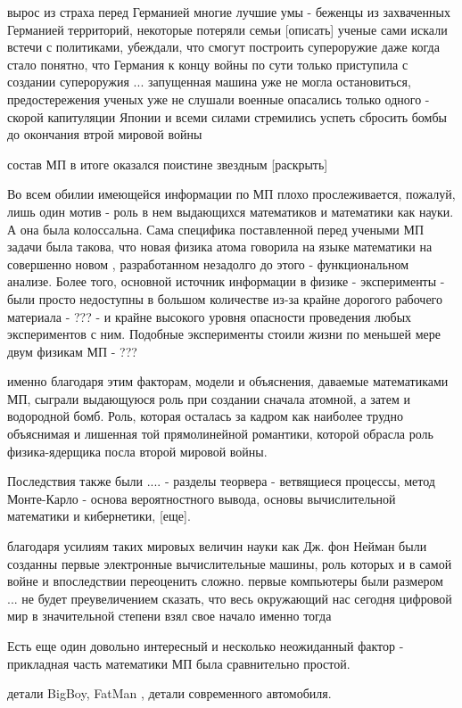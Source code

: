 вырос из страха перед Германией
многие лучшие умы - беженцы из захваченных Германией территорий, некоторые потеряли семьи [описать]
ученые сами искали встечи с политиками, убеждали, что смогут построить супероружие
даже когда стало понятно, что Германия к концу войны по сути только приступила с создании супероружия ...  запущенная машина уже не могла остановиться, предостережения ученых уже не слушали
военные опасались только  одного - скорой капитуляции Японии и всеми силами стремились успеть сбросить бомбы до окончания втрой мировой войны

состав МП в итоге оказался поистине звездным [раскрыть]

Во всем обилии имеющейся информации по МП плохо прослеживается, пожалуй, лишь один мотив - роль в нем выдающихся математиков и математики как науки.
А она была колоссальна.
Сама специфика поставленной перед учеными МП задачи была такова, что новая физика атома говорила на языке математики на совершенно новом , разработанном незадолго до этого - функциональном анализе.
Более того, основной источник информации в физике - эксперименты - были просто недоступны в большом количестве из-за крайне дорогого рабочего материала - ??? - 
и крайне высокого уровня опасности проведения любых экспериментов с ним. Подобные эксперименты стоили жизни по меньшей мере двум физикам МП - ???

именно благодаря этим факторам, модели и объяснения, даваемые математиками МП, сыграли выдающуюся роль при создании сначала атомной, а затем и водородной бомб. 
Роль, которая осталась за кадром как наиболее трудно объяснимая и лишенная той прямолинейной романтики, которой обрасла роль физика-ядерщика посла второй мировой войны.

Последствия также были .... - разделы теорвера - ветвящиеся процессы, метод Монте-Карло - основа вероятностного вывода, основы вычислительной математики и кибернетики, [еще].

благодаря усилиям таких мировых величин науки как Дж. фон Нейман были созданны первые электронные вычислительные машины, роль которых и в самой войне и впоследствии переоценить сложно.
первые компьютеры были размером ...
не будет преувеличением сказать, что весь окружающий нас сегодня цифровой мир в значительной степени взял свое начало именно тогда
  
Есть еще один довольно интересный и несколько неожиданный фактор - прикладная часть математики МП была сравнительно простой. 

детали BigBoy, FatMan , детали современного автомобиля.


